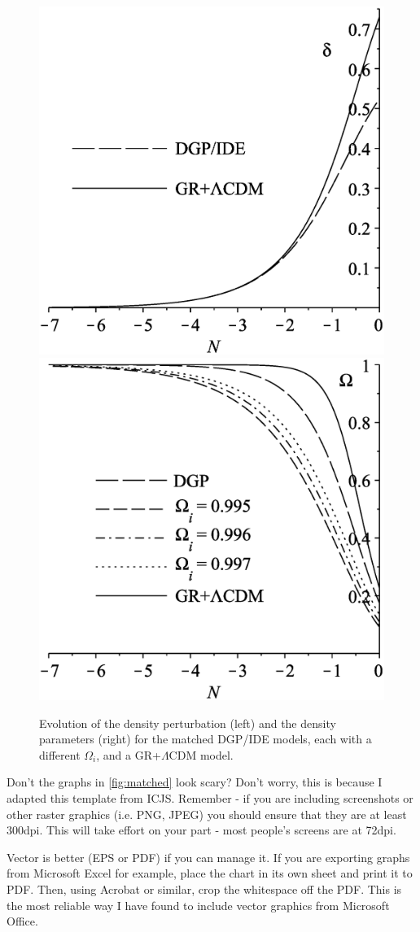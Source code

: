 \begin{figure}
\includegraphics[width=0.49\columnwidth]{figures/dgpdeltas.eps}
\includegraphics[width=0.49\columnwidth]{figures/dgpomegas.eps}
\caption[Evolutions of $\delta$ and $\Omega$ for DGP]{Evolution of the density perturbation (left) and the density parameters (right) for the matched DGP/IDE models, each with a different $\Omega_i$,
and a GR+$\Lambda$CDM model.
\label{fig:matched}}
\end{figure}

Don't the graphs in \autoref{fig:matched} look scary? Don't worry, this is because I adapted this template from ICJS. Remember - if you are including screenshots or other raster graphics (i.e. PNG, JPEG) you should ensure that they are at least 300dpi. This will take effort on your part - most people's screens are at 72dpi.   

Vector is better (EPS or PDF) if you can manage it. If you are exporting graphs from Microsoft Excel for example, place the chart in its own sheet and print it to PDF. Then, using Acrobat or similar, crop the whitespace off the PDF. This is the most reliable way I have found to include vector graphics from Microsoft Office.







